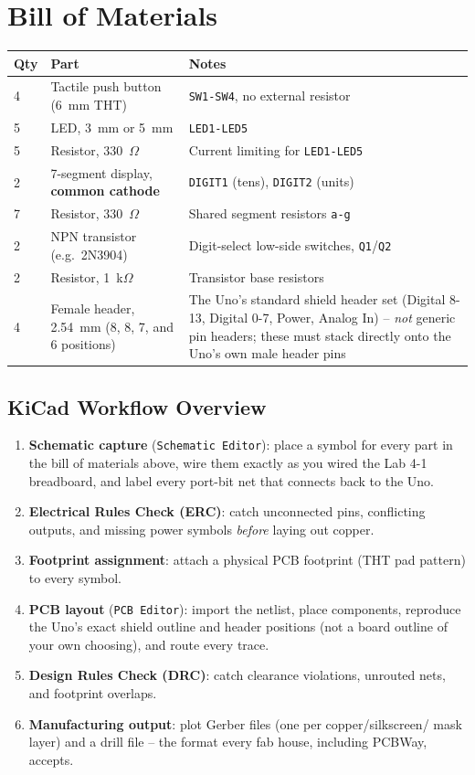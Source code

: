 \documentclass[11pt]{article}
\begin{document}
\section*{Bill of Materials}
\begin{center}
\begin{tabular}{@{}p{1.4cm}p{6.3cm}p{7.5cm}@{}}
\toprule
\textbf{Qty} & \textbf{Part} & \textbf{Notes} \\
\midrule
4 & Tactile push button (6~mm THT) & \texttt{SW1-SW4}, no external resistor \\
5 & LED, 3~mm or 5~mm & \texttt{LED1-LED5} \\
5 & Resistor, 330~$\Omega$ & Current limiting for \texttt{LED1-LED5} \\
2 & 7-segment display, \textbf{common cathode} & \texttt{DIGIT1} (tens), \texttt{DIGIT2} (units) \\
7 & Resistor, 330~$\Omega$ & Shared segment resistors \texttt{a-g} \\
2 & NPN transistor (e.g.\ 2N3904) & Digit-select low-side switches, \texttt{Q1}/\texttt{Q2} \\
2 & Resistor, 1~k$\Omega$ & Transistor base resistors \\
4 & Female header, 2.54~mm (8, 8, 7, and 6 positions) & The Uno's standard shield
header set (Digital 8-13, Digital 0-7, Power, Analog In) -- \emph{not} generic
pin headers; these must stack directly onto the Uno's own male header pins \\
\bottomrule
\end{tabular}
\end{center}

\subsection*{KiCad Workflow Overview}
\begin{enumerate}[leftmargin=*,nosep]
  \item \textbf{Schematic capture} (\texttt{Schematic Editor}): place a symbol for
        every part in the bill of materials above, wire them exactly as you wired
        the Lab 4-1 breadboard, and label every port-bit net that connects back to
        the Uno.
  \item \textbf{Electrical Rules Check (ERC)}: catch unconnected pins, conflicting
        outputs, and missing power symbols \emph{before} laying out copper.
  \item \textbf{Footprint assignment}: attach a physical PCB footprint (THT pad
        pattern) to every symbol.
  \item \textbf{PCB layout} (\texttt{PCB Editor}): import the netlist, place
        components, reproduce the Uno's exact shield outline and header
        positions (not a board outline of your own choosing), and route every
        trace.
  \item \textbf{Design Rules Check (DRC)}: catch clearance violations, unrouted
        nets, and footprint overlaps.
  \item \textbf{Manufacturing output}: plot Gerber files (one per copper/silkscreen/
        mask layer) and a drill file -- the format every fab house, including
        PCBWay, accepts.
\end{enumerate}
\end{document}
